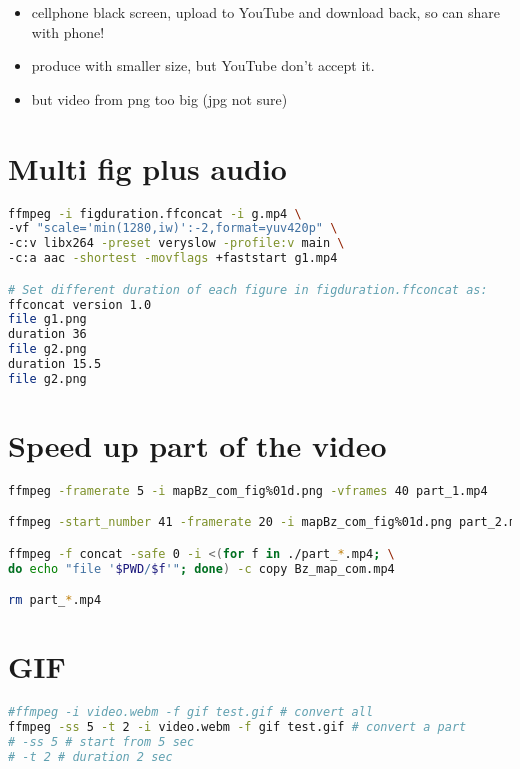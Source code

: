 \begin{itemize}
\item {} cellphone black screen, upload to YouTube and download back, so can share with phone!
\item {} produce with smaller size, but YouTube don't accept it.
\item {} but video from png too big (jpg not sure)
\end{itemize}


\section{Multi fig plus audio}

\begin{lstlisting}[language=bash, caption={Multi fig plus audio}]
ffmpeg -i figduration.ffconcat -i g.mp4 \
-vf "scale='min(1280,iw)':-2,format=yuv420p" \
-c:v libx264 -preset veryslow -profile:v main \
-c:a aac -shortest -movflags +faststart g1.mp4

# Set different duration of each figure in figduration.ffconcat as:
ffconcat version 1.0
file g1.png
duration 36
file g2.png
duration 15.5
file g2.png
\end{lstlisting}


\section{Speed up part of the video}

\begin{lstlisting}[language=bash, caption={Speed up a fraction of the video}]
ffmpeg -framerate 5 -i mapBz_com_fig%01d.png -vframes 40 part_1.mp4

ffmpeg -start_number 41 -framerate 20 -i mapBz_com_fig%01d.png part_2.mp4

ffmpeg -f concat -safe 0 -i <(for f in ./part_*.mp4; \
do echo "file '$PWD/$f'"; done) -c copy Bz_map_com.mp4

rm part_*.mp4
\end{lstlisting}


\section{GIF}

\begin{lstlisting}[language=bash, caption={convert video to GIF}]
#ffmpeg -i video.webm -f gif test.gif # convert all
ffmpeg -ss 5 -t 2 -i video.webm -f gif test.gif # convert a part
# -ss 5 # start from 5 sec
# -t 2 # duration 2 sec
\end{lstlisting}


